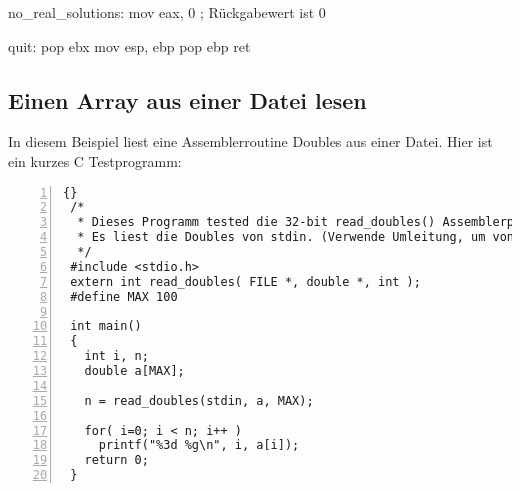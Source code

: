 \begin{AsmCodeListing}[label=quad.asm, numbers=left, commentchar=$, commandchars=\\\{\}]
 no_real_solutions:
         mov     eax, 0          ; R\"{u}ckgabewert ist 0

 quit:
         pop     ebx
         mov     esp, ebp
         pop     ebp
         ret
\end{AsmCodeListing}

\subsection{Einen Array aus einer Datei lesen }

In diesem Beispiel liest eine Assemblerroutine Doubles aus einer
Datei. Hier ist ein kurzes C Testprogramm:
\begin{lstlisting}[numbers=left]{}
 /*
  * Dieses Programm tested die 32-bit read_doubles() Assemblerprozedur.
  * Es liest die Doubles von stdin. (Verwende Umleitung, um von Datei zu lesen.)
  */
 #include <stdio.h>
 extern int read_doubles( FILE *, double *, int );
 #define MAX 100

 int main()
 {
   int i, n;
   double a[MAX];

   n = read_doubles(stdin, a, MAX);

   for( i=0; i < n; i++ )
     printf("%3d %g\n", i, a[i]);
   return 0;
 }
\end{lstlisting}

